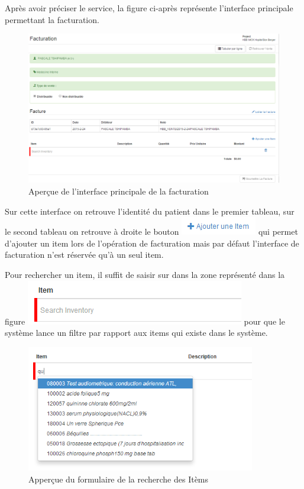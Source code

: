 \documentclass[12pt,a4paper]{report}
\begin{document}
\newpage
Après avoir préciser le service, la figure ci-après représente l'interface principale permettant la facturation.

\begin{figure}[h]
\begin{center}
\includegraphics[width=14cm]{pic/FacturationInterface.png}
\end{center}
\caption{Aperçue de l'interface principale de la facturation}
\label{Aperçue de l'interface principale de la facturation}
\end{figure}

Sur cette interface on retrouve l'identité du patient dans le premier tableau, sur le second tableau on retrouve à droite le bouton \includegraphics[scale=0.7]{pic/AjouterItem.png} qui permet d'ajouter un item lors de l'opération de facturation mais par défaut l'interface de facturation n'est réservée qu'à un seul item.

Pour rechercher un item, il suffit de saisir sur dans la zone représenté dans la figure 
\includegraphics[scale=0.7]{pic/RechercheItem.png} pour que le système lance un filtre par rapport aux items qui existe dans le système.

\begin{figure}[h]
\begin{center}
\includegraphics[width=10cm]{pic/AppRechercheItem.png}
\end{center}
\caption{Apperçue du formulaire de la recherche des Itèms}
\label{Apperçue du formulaire de la recherche des Itèms}
\end{figure}
\end{document}
